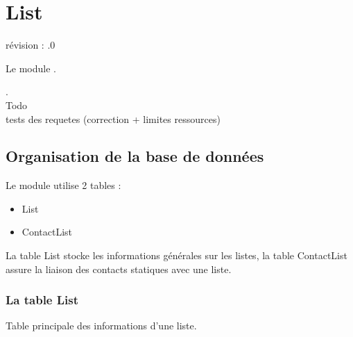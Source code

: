 

\clearpage
\section{List}

révision : .0

Le module \List \obm.

.\\
Todo\\
tests des requetes (correction + limites ressources)\\

\subsection{Organisation de la base de données}

Le module \List utilise 2 tables :
\begin{itemize}
 \item List
 \item ContactList
\end{itemize}
\vspace{0.3cm}

La table List stocke les informations générales sur les listes, la table ContactList assure la liaison des contacts statiques avec une liste.


\subsubsection{La table List}
Table principale des informations d'une liste.\\

